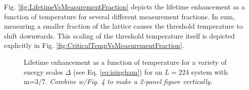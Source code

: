 \documentclass[twocolumn,superscriptaddress,aps,prb,floatfix]{revtex4-1}
\newcommand{\figref}[1]{Fig. \ref{#1}}
\newcommand{\CMH}[1]{{\color{green} { #1}}}
\begin{document}
\figref{fig:LifetimeVsMeasurementFraction} depicts the lifetime enhancement as a function of temperature for several different measurement fractions.  In sum, measuring a smaller fraction of the lattice causes the threshold temperature to shift downwards.  This scaling of the threshold temperature itself is depicted explicitly in \figref{fig:CriticalTempVsMeasurementFraction}.

\begin{figure}
\begin{center}
\end{center}
\caption{Lifetime enhancement as a function of temperature for a variety of energy scales $\Delta$ (see Eq. \ref{eq:isingham}) for an $L=224$ system with m=$3/7$. \CMH{\it{{Combine w/Fig. 4 to make a 2-panel figure vertically.}}}}
\label{fig:LifetimeVsTemperatureVsEnergy}
\end{figure}
\end{document}

